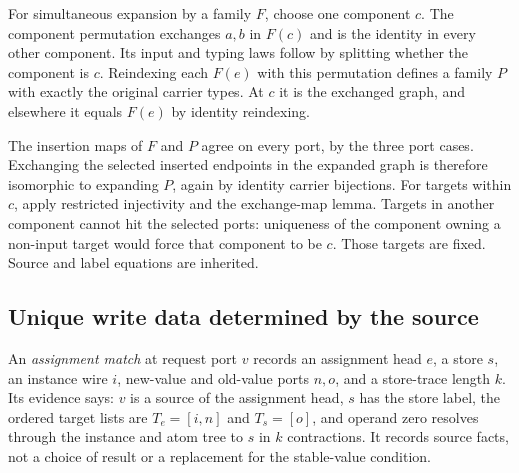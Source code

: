 
For simultaneous expansion by a family $F$, choose one component $c$.
The component permutation exchanges $a,b$ in $F(c)$ and is the identity in
every other component. Its input and typing laws follow by splitting whether
the component is $c$. Reindexing each $F(e)$ with this permutation defines a
family $P$ with exactly the original carrier types. At $c$ it is the exchanged
graph, and elsewhere it equals $F(e)$ by identity reindexing.







The insertion maps of $F$ and $P$ agree on every port, by the three port
cases. Exchanging the selected inserted endpoints in the expanded graph is
therefore isomorphic to expanding $P$, again by identity carrier bijections.
For targets within $c$, apply restricted injectivity and the exchange-map
lemma. Targets in another component cannot hit the selected ports: uniqueness
of the component owning a non-input target would force that component to be
$c$. Those targets are fixed. Source and label equations are inherited.



\subsection{Unique write data determined by the source}

An \emph{assignment match} at request port $v$ records an assignment head $e$,
a store $s$, an instance wire $i$, new-value and old-value ports $n,o$, and a
store-trace length $k$. Its evidence says: $v$ is a source of the assignment
head, $s$ has the store label, the ordered target lists are
$T_e=[i,n]$ and $T_s=[o]$, and operand zero resolves through the instance and
atom tree to $s$ in $k$ contractions. It records source facts, not a choice
of result or a replacement for the stable-value condition.

